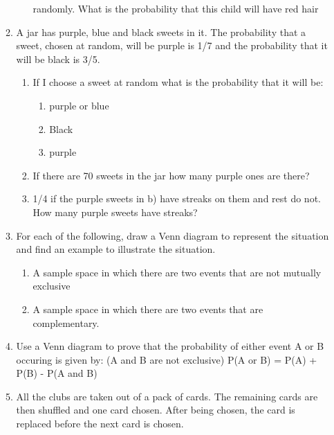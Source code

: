 \begin{enumerate}[noitemsep, label=\textbf{\arabic*}. ]
\begin{enumerate}[noitemsep, label=\textbf{\alph*}. ]
\begin{enumerate}[noitemsep, label=\textbf{\arabic*}. ]
randomly. What is the probability that this child will have red hair
\end{enumerate}
                \label{m39373*uid137}\item A jar has purple, blue and black sweets in it. The
probability that a sweet, chosen at random, will be purple is 1/7 and the
probability that it will be black is 3/5.
\label{m39373*id116346}\begin{enumerate}[noitemsep, label=\textbf{\alph*}. ] 
            \label{m39373*uid138}\item If I choose a sweet at random what
is the probability that it will be:
\label{m39373*id116362}\begin{enumerate}[noitemsep, label=\textbf{\roman*}. ] 
            \label{m39373*uid139}\item purple or blue
\label{m39373*uid140}\item Black
\label{m39373*uid141}\item purple
\end{enumerate}
        \label{m39373*uid142}\item If there are 70 sweets in the jar how
many purple ones are there?
\label{m39373*uid143}\item 1/4 if the purple sweets in b) have streaks on them and
rest do not. How many purple sweets have streaks?
\end{enumerate}
                \label{m39373*uid144}\item For each of the following, draw a Venn diagram to
represent the situation and find an example to illustrate the situation.
\label{m39373*id116443}\begin{enumerate}[noitemsep, label=\textbf{\alph*}. ] 
            \label{m39373*uid145}\item A sample space in which there are
two events that are not mutually exclusive
\label{m39373*uid146}\item A sample space in which there are two events that are
complementary.
\end{enumerate}
                \label{m39373*uid147}\item Use a Venn diagram to prove that the probability of
either event A or B occuring is given by: (A and B are not exclusive)
P(A or B) = P(A) + P(B) - P(A and B)\newline
\label{m39373*uid148}\item All the clubs are taken out of a pack of cards. The
remaining cards are then shuffled and one card chosen. After being chosen, the
card is replaced before the next card is chosen.

\end{enumerate}
\end{enumerate}
